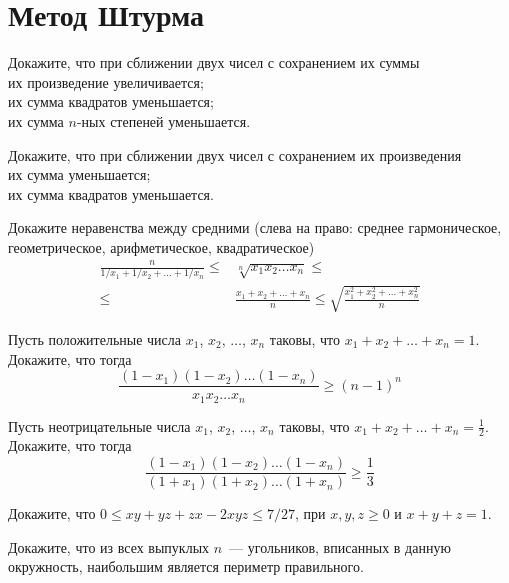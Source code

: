 

\section*{Метод Штурма}


\begin{problems}

\item
Докажите, что при сближении двух чисел с сохранением их суммы
\\
\sbp их произведение увеличивается;
\\
\sbp их сумма квадратов уменьшается;
\\
\sbp их сумма $n$-ных степеней уменьшается.

\item
Докажите, что при сближении двух чисел с сохранением их произведения
\\
\sbp их сумма уменьшается;
\\
\sbp их сумма квадратов уменьшается.

\item
Докажите неравенства между средними
(слева на право: среднее гармоническое, геометрическое, арифметическое, квадратическое)
\begin{align*}
    \frac{n}{1 / x_1 + 1 / x_2 + \ldots + 1 / x_n}
\leq{}&
    \sqrt[n]{x_1 x_2 \ldots x_n}
\leq\\\leq{}&
    \frac{x_1 + x_2 + \ldots + x_n}{n}
\leq
    \sqrt{\frac{x_1^2 + x_2^2 + \ldots + x_n^2}{n}}
\end{align*}

\item
Пусть положительные числа $x_1$, $x_2$, $\ldots$, $x_n$ таковы, что
$x_1 + x_2 + \ldots + x_n = 1$.
Докажите, что тогда
\[
    \frac{(1 - x_1) (1 - x_2) \ldots (1 - x_n)}{x_1 x_2 \ldots x_n}
\geq
    (n - 1)^n
\]

\item
Пусть неотрицательные числа $x_1$, $x_2$, $\ldots$, $x_n$ таковы, что
$x_1 + x_2 + \ldots + x_n = \frac{1}{2}$.
Докажите, что тогда
\[
    \frac{(1 - x_1) (1 - x_2) \ldots (1 - x_n)}{(1 + x_1) (1 + x_2) \ldots (1 + x_n)}
\geq
    \frac{1}{3}
\]

\item
Докажите, что $0 \leq x y + y z + z x - 2 x y z \leq 7 / 27$, при
$x, y, z \geq 0$ и $x + y + z = 1$.

\item
Докажите, что из всех выпуклых $n$~--- угольников, вписанных в данную окружность,
наибольшим является периметр правильного.


\end{problems}

